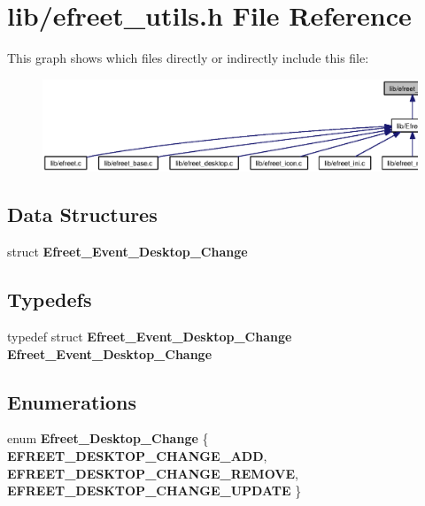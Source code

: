 \section{lib/efreet\_\-utils.h File Reference}
\label{efreet__utils_8h}




This graph shows which files directly or indirectly include this file:\nopagebreak
\begin{figure}[H]
\begin{center}
\leavevmode
\includegraphics[width=420pt]{efreet__utils_8h__dep__incl}
\end{center}
\end{figure}
\subsection*{Data Structures}
\begin{CompactItemize}
\item 
struct {\bf Efreet\_\-Event\_\-Desktop\_\-Change}
\end{CompactItemize}
\subsection*{Typedefs}
\begin{CompactItemize}
\item 
typedef struct {\bf Efreet\_\-Event\_\-Desktop\_\-Change} {\bf Efreet\_\-Event\_\-Desktop\_\-Change}
\end{CompactItemize}
\subsection*{Enumerations}
\begin{CompactItemize}
\item 
enum {\bf Efreet\_\-Desktop\_\-Change} \{ {\bf EFREET\_\-DESKTOP\_\-CHANGE\_\-ADD}, 
{\bf EFREET\_\-DESKTOP\_\-CHANGE\_\-REMOVE}, 
{\bf EFREET\_\-DESKTOP\_\-CHANGE\_\-UPDATE}
 \}
\end{CompactItemize}

